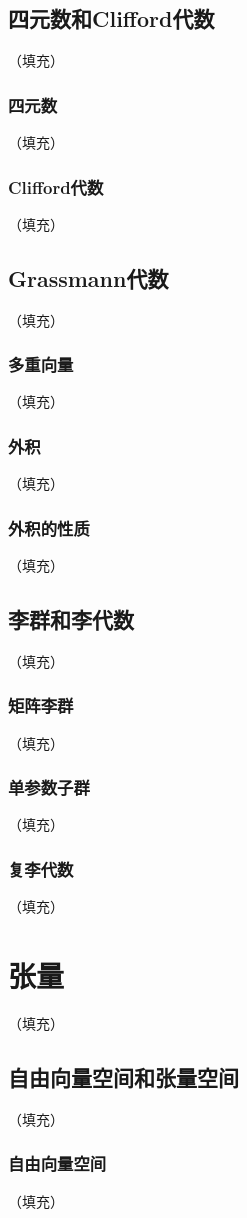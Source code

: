 \documentclass[hyperref,UTF8]{ctexbook}
\begin{document}
\section{四元数和Clifford代数}（填充）
\subsection{四元数}（填充）
\subsection{Clifford代数}（填充）
\section{Grassmann代数}（填充）
\subsection{多重向量}（填充）
\subsection{外积}（填充）
\subsection{外积的性质}（填充）
\section{李群和李代数}（填充）
\subsection{矩阵李群}（填充）
\subsection{单参数子群}（填充）
\subsection{复李代数}（填充）
\chapter{张量}（填充）
\section{自由向量空间和张量空间}（填充）
\subsection{自由向量空间}（填充）
\end{document}

